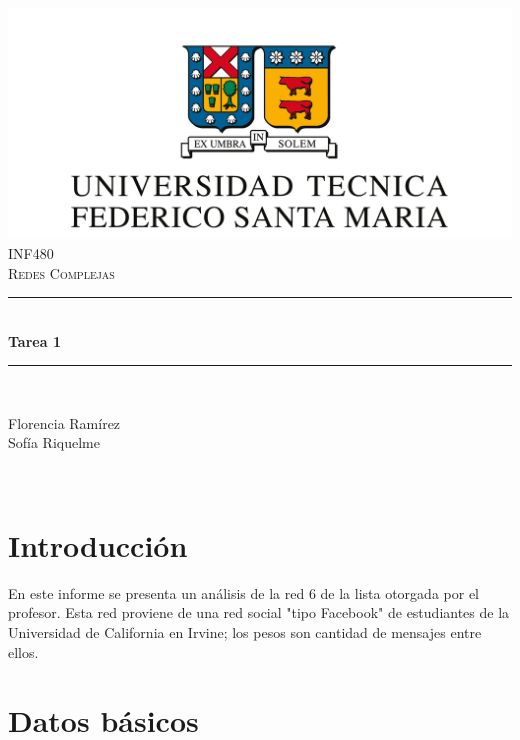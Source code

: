 \documentclass[12pt]{article}
\begin{document}
\begin{titlepage}
\newcommand{\HRule}{\rule{\linewidth}{0.5mm}} 
\center

\includegraphics[scale=0.4]{images/logo-usm.png}\\
\vspace{0.6cm}
\textsc{\large INF480}\\[0.5cm] %
\textsc{\Large Redes Complejas}\\[0.5cm] %

\HRule \\[0.4cm]
{ \huge \bfseries Tarea 1}\\[0.4cm] %
\HRule \\[1.5cm]
 
\begin{minipage}{0.4\textwidth}
\begin{flushleft} \large
Florencia Ramírez\\
Sofía Riquelme
\end{flushleft}

\end{minipage}\\[2cm]

\vfill %

\end{titlepage}

\section{Introducción}
En este informe se presenta un análisis de la red 6 de la lista otorgada por el profesor. Esta red proviene de una red social "tipo Facebook" de estudiantes de la Universidad de California en Irvine; los pesos son cantidad de mensajes entre ellos.
\section{Datos básicos}
\end{document}
